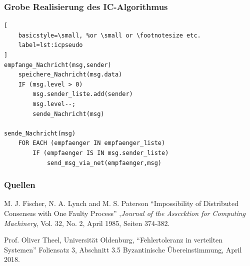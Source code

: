 \documentclass[aspectratio=169]{beamer}
\begin{document}
\begin{frame}[fragile]
    \frametitle{Grobe Realisierung des IC-Algorithmus}

\begin{center}
\begin{lstlisting}[
    basicstyle=\small, %or \small or \footnotesize etc.
    label=lst:icpseudo
]
empfange_Nachricht(msg,sender)
    speichere_Nachricht(msg.data)
    IF (msg.level > 0)
        msg.sender_liste.add(sender)
        msg.level--;
        sende_Nachricht(msg)

sende_Nachricht(msg) 
    FOR EACH (empfaenger IN empfaenger_liste) 
        IF (empfaenger IS IN msg.sender_liste)
            send_msg_via_net(empfaenger,msg)
\end{lstlisting}

\end{center}
\end{frame}


\begin{frame}
    \frametitle{Quellen} 
    
\begin{thebibliography}{9}

M. J. Fischer, N. A. Lynch and M. S. Paterson
``Impossibility of Distributed Consensus with One Faulty Process''
,{\em Journal of the Assccktion for Computing Machinery}, Vol. 32, No. 2, April 1985, Seiten 374-382.

Prof. Oliver Theel, 
Universität Oldenburg,
``Fehlertoleranz in verteilten Systemen''
Foliensatz 3, Abschnitt 3.5 Byzantinische Übereinstimmung, April 2018.

\end{thebibliography}

\end{frame}
\end{document}
